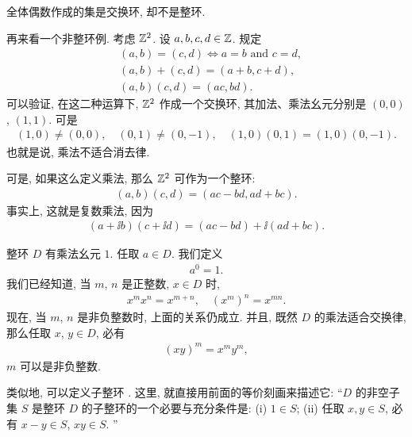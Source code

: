 \begin{example}
    全体偶数作成的集是交换环, 却不是整环.
\end{example}

\begin{example}
    再来看一个非整环例. 考虑 $\mathbb{Z}^2$. 设 $a,b,c,d \in \mathbb{Z}$. 规定
    \begin{align*}
         & (a,b) = (c,d) \iff a = b \text{ and } c = d, \\
         & (a,b) + (c,d) = (a+b,c+d),                   \\
         & (a,b)(c,d) = (ac,bd).
    \end{align*}
    可以验证, 在这二种运算下, $\mathbb{Z}^2$ 作成一个交换环, 其加法、乘法幺元分别是 $(0,0)$, $(1,1)$. 可是
    \begin{align*}
        (1,0) \neq (0,0), \quad (0,1) \neq (0,-1), \quad (1,0)(0,1) = (1,0)(0,-1).
    \end{align*}
    也就是说, 乘法不适合消去律.
\end{example}

\begin{remark}
    可是, 如果这么定义乘法, 那么 $\mathbb{Z}^2$ 可作为一个整环:
    \begin{align*}
        (a,b)(c,d) = (ac-bd,ad+bc).
    \end{align*}
    事实上, 这就是复数乘法, 因为
    \begin{align*}
        (a+ \ii b)(c+ \ii d) = (ac-bd) + \ii (ad+bc).
    \end{align*}
\end{remark}

\begin{remark}
    整环 $D$ 有乘法幺元 $1$. 任取 $a \in D$. 我们定义
    \begin{align*}
        a^0 = 1.
    \end{align*}
    我们已经知道, 当 $m$, $n$ 是正整数, $x \in D$ 时,
    \begin{align*}
        x^m x^n = x^{m+n}, \quad (x^m)^n = x^{mn}.
    \end{align*}
    现在, 当 $m$, $n$ 是非负整数时, 上面的关系仍成立. 并且, 既然 $D$ 的乘法适合交换律, 那么任取 $x$, $y \in D$, 必有
    \begin{align*}
        (xy)^m = x^m y^m,
    \end{align*}
    $m$ 可以是非负整数.
\end{remark}

\begin{remark}
    类似地, 可以定义子整环 . 这里, 就直接用前面的等价刻画来描述它: ``$D$ 的非空子集 $S$ 是整环 $D$ 的子整环的一个必要与充分条件是: (i) $1 \in S$; (ii) 任取 $x,y \in S$, 必有 $x-y \in S$, $xy \in S$. ''
\end{remark}

